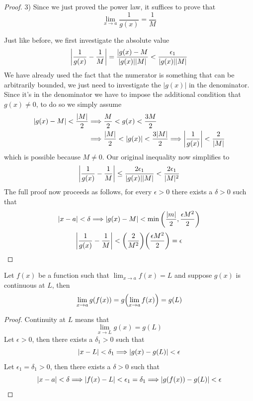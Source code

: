 \begin{proof}
	3) Since we just proved the power law, it suffices to prove that
	\[ \lim_{x \to a} \frac{1}{g(x)} = \frac{1}{M} \]
	
	Just like before, we first investigate the absolute value
	\[ \abs{\frac{1}{g(x)} - \frac{1}{M}} = \frac{|g(x) - M}{|g(x)||M|} < \frac{\epsilon_1}{|g(x)||M|} \]
	We have already used the fact that the numerator is something that can be arbitrarily bounded, we just need to investigate the $|g(x)|$ in the denominator. Since it's in the denominator we have to impose the additional condition that $g(x) \neq 0$, to do so we simply assume
	\begin{align*}
		|g(x) - M| < \frac{|M|}{2} &\Longrightarrow \frac{M}{2} < g(x) < \frac{3M}{2} \\
		&\Longrightarrow \frac{|M|}{2} < |g(x)| < \frac{3|M|}{2} \Longrightarrow \abs{\frac{1}{g(x)}} < \frac{2}{|M|}
	\end{align*}
	which is possible because $M \neq 0$. Our original inequality now simplifies to
	\[ \abs{\frac{1}{g(x)} - \frac{1}{M}} \leq \frac{2\epsilon_1}{|g(x)||M|} < \frac{2\epsilon_1}{|M|^2} \]
	The full proof now proceeds as follows, for every $\epsilon > 0$ there exists a $\delta > 0$ such that
	\[ |x - a| < \delta \Longrightarrow |g(x) - M| < \min\qty(\frac{|m|}{2}, \frac{\epsilon M^2}{2}) \]
	\[ \abs{\frac{1}{g(x)} - \frac{1}{M}} < \qty(\frac{2}{M^2}) \qty(\frac{\epsilon M^2}{2}) = \epsilon \]
	
\end{proof}

\begin{theorem}
	Let $f(x)$ be a function such that $\lim_{x \to a} f(x) = L$ and suppose $g(x)$ is continuous at $L$, then
	\[ \lim_{x \to a} g(f(x)) = g\qty(\lim_{x \to a} f(x)) = g(L) \]
\end{theorem}
\begin{proof}
	Continuity at $L$ means that
	\[ \lim_{x \to L} g(x) = g(L) \]
	Let $\epsilon > 0$, then there exists a $\delta_1 > 0$ such that
	\[ |x - L| < \delta_1 \Longrightarrow |g(x) - g(L)| < \epsilon \]
	Let $\epsilon_1 = \delta_1 > 0$, then there exists a $\delta > 0$ such that
	\[ |x - a| < \delta \Longrightarrow |f(x) - L| < \epsilon_1 = \delta_1 \Longrightarrow |g(f(x)) - g(L)| < \epsilon \]
\end{proof}